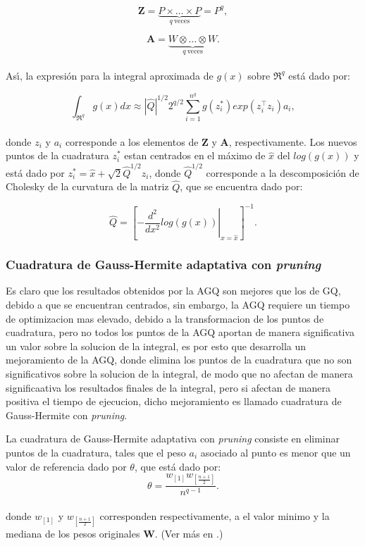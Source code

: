 \[
\textbf{Z}=\underbrace{P \times \ldots \times P}_{q\ \text{veces}}=P^q,
\]

\[
\textbf{A}=\underbrace{W \otimes \ldots \otimes W}_{q\ \text{veces}}.
\]
\\
As\'{\i}, la expresi\'{o}n para la integral aproximada de $g(x)$ sobre $\Re^q$ est\'{a} dado por:

\[
\int_{\Re^q}{g(x)dx}\approx|\hat{Q}|^{1/2} 2^{q/2}\sum_{i=1}^{n^q}g(z_i^*)exp(z_i^{\top}z_i)a_i,
\]
\\
donde $z_i$ y $a_i$ corresponde a los elementos de $\textbf{Z}$ y $\textbf{A}$, respectivamente. Los nuevos puntos de la cuadratura $z_i^*$ estan centrados en el m\'{a}ximo de $\hat{x}$ del $log(g(x))$ y est\'{a} dado por $z_i^*=\hat{x}+\sqrt{2}\hat{Q}^{1/2}z_i$, donde $\hat{Q}^{1/2}$ corresponde a la descomposici\'{o}n de Cholesky de la curvatura de la matriz $\hat{Q}$, que se encuentra dado por:

\[
\hat{Q}={\left[\left. -\frac{d^2}{dx^2}log(g(x))\right|_{x=\hat{x}}\right]^{-1}}.
\]

\subsubsection{Cuadratura de Gauss-Hermite adaptativa con \textit{pruning}}

Es claro que los resultados obtenidos por la AGQ son mejores que los de GQ, debido a que se encuentran centrados, sin embargo, la AGQ requiere un tiempo de optimizacion mas elevado, debido a la transformacion de los puntos de cuadratura, pero no todos los puntos de la AGQ aportan de manera significativa un valor sobre la solucion de la integral, es por esto que \cite{Hernandez1} desarrolla un mejoramiento de la AGQ, donde elimina los puntos de la cuadratura que no son significativos sobre la solucion de la integral, de modo que no afectan de manera significaativa los resultados finales de la integral, pero si afectan de manera positiva el tiempo de ejecucion, dicho mejoramiento es llamado cuadratura de Gauss-Hermite con \textit{pruning}. 

La cuadratura de Gauss-Hermite adaptativa con \textit{pruning} consiste en eliminar puntos de la cuadratura, tales que el peso $a_i$ asociado al punto es menor que un valor de referencia dado por $\theta$, que est\'{a} dado por:
\[
\theta=\frac{w_{[1]}w_{[\frac{n+1}{2}]}}{n^{q-1}}.
\]
\\
donde $w_{[1]}$ y $w_{[\frac{n+1}{2}]}$ corresponden respectivamente, a el valor minimo y la mediana de los pesos originales \textbf{W}. (Ver m\'{a}s en \cite{Hernandez1}.)


